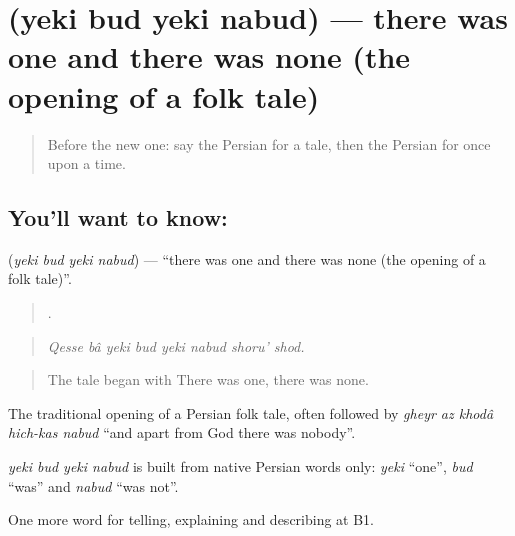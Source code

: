 \section[\texorpdfstring{\fa{یکی} \fa{بود} \fa{یکی} \fa{نبود} (yeki bud yeki nabud)}{یکی بود یکی نبود (yeki bud yeki nabud)}]{    (yeki bud yeki nabud) — there was one and there was none (the opening of a folk tale)}

\label{lesson:FA-C345-yeki-bud-yeki-nabud}



\begin{quote}
Before the new one: say the Persian for a tale, then the Persian for once upon a time.
\end{quote}

\subsection*{You'll want to know:    }
\textbf{   } (\emph{yeki bud yeki nabud}) — \textquotedblleft{}there was one and there was none (the opening of a folk tale)\textquotedblright{}.

\begin{quote}
       .
\end{quote}

\begin{quote}
\emph{Qesse bâ yeki bud yeki nabud shoru' shod.}
\end{quote}

\begin{quote}
The tale began with There was one, there was none.
\end{quote}

The traditional opening of a Persian folk tale, often followed by \emph{gheyr az khodâ hich-kas nabud} \textquotedblleft{}and apart from God there was nobody\textquotedblright{}.

\begin{cousinweb}
\emph{yeki bud yeki nabud} is built from native Persian words only: \emph{yeki} \textquotedblleft{}one\textquotedblright{}, \emph{bud} \textquotedblleft{}was\textquotedblright{} and \emph{nabud} \textquotedblleft{}was not\textquotedblright{}.
\end{cousinweb}

\begin{grammarlens}[title={What you've built}]
One more word for telling, explaining and describing at B1.
\end{grammarlens}


